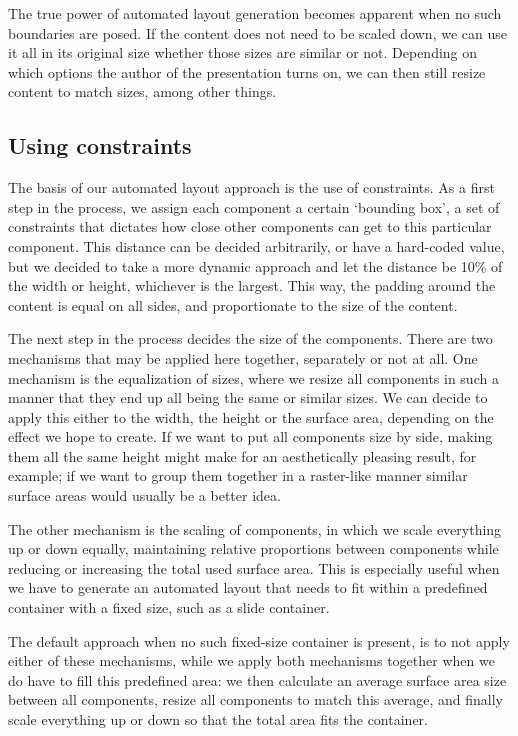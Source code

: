    The true power of automated layout generation becomes apparent when no such
   boundaries are posed. If the content does not need to be scaled down, we can
   use it all in its original size whether those sizes are similar or not.
   Depending on which options the author of the presentation turns on, we can
   then still resize content to match sizes, among other things.

   \subsection{Using constraints}

    The basis of our automated layout approach is the use of constraints. As a
    first step in the process, we assign each component a certain `bounding
    box', a set of constraints that dictates how close other components can get
    to this particular component. This distance can be decided arbitrarily, or
    have a hard-coded value, but we decided to take a more dynamic approach and
    let the distance be 10\% of the width or height, whichever is the largest.
    This way, the padding around the content is equal on all sides, and
    proportionate to the size of the content.

    The next step in the process decides the size of the components. There are
    two mechanisms that may be applied here together, separately or not at all.
    One mechanism is the equalization of sizes, where we resize all components
    in such a manner that they end up all being the same or similar sizes. We
    can decide to apply this either to the width, the height or the surface
    area, depending on the effect we hope to create. If we want to put all
    components size by side, making them all the same height might make for an
    aesthetically pleasing result, for example; if we want to group them
    together in a raster-like manner similar surface areas would usually be a
    better idea.

    The other mechanism is the scaling of components, in which we scale
    everything up or down equally, maintaining relative proportions between
    components while reducing or increasing the total used surface area. This
    is especially useful when we have to generate an automated layout that
    needs to fit within a predefined container with a fixed size, such as a
    slide container.

    The default approach when no such fixed-size container is present, is to
    not apply either of these mechanisms, while we apply both mechanisms
    together when we do have to fill this predefined area: we then calculate an
    average surface area size between all components, resize all components to
    match this average, and finally scale everything up or down so that the
    total area fits the container.


